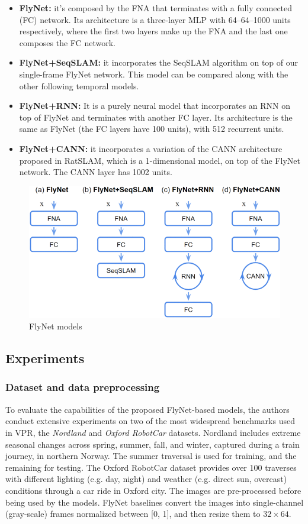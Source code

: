 \begin{itemize}
\item
  \textbf{FlyNet:} it's composed by the FNA that terminates with a fully
  connected (FC) network. Its architecture is a three-layer MLP with
  64--64--1000 units respectively, where the first two layers make up
  the FNA and the last one composes the FC network.
\item
  \textbf{FlyNet+SeqSLAM:} it incorporates the SeqSLAM algorithm on top
  of our single-frame FlyNet network. This model can be compared along
  with the other following temporal models.
\item
  \textbf{FlyNet+RNN:} It is a purely neural model that incorporates an
  RNN on top of FlyNet and terminates with another FC layer. Its
  architecture is the same as FlyNet (the FC layers have 100 units),
  with 512 recurrent units. 
\item
  \textbf{FlyNet+CANN:} it incorporates a variation of the CANN
  architecture proposed in RatSLAM, which is a 1-dimensional model, on
  top of the FlyNet network. The CANN layer has 1002 units.
\end{itemize}

\begin{figure}[h!]
\centering
\includegraphics[width=0.8\linewidth]{images/flynetmodels.png}
\caption{FlyNet models}
\end{figure}

\subsection{Experiments}\label{header-n205}

\subsubsection{Dataset and data preprocessing}\label{header-n206}

To evaluate the capabilities of the proposed FlyNet-based models, the
authors conduct extensive experiments on two of the most widespread
benchmarks used in VPR, the \emph{Nordland} and \emph{Oxford RobotCar}
datasets. Nordland includes extreme seasonal changes across spring,
summer, fall, and winter, captured during a train journey, in northern
Norway. The summer traversal is used for training, and the remaining for
testing. The Oxford RobotCar dataset provides over 100 traverses with
different lighting (e.g. day, night) and weather (e.g. direct sun,
overcast) conditions through a car ride in Oxford city. The images are
pre-processed before being used by the models. FlyNet baselines convert
the images into single-channel (gray-scale) frames normalized between
{[}0, 1{]}, and then resize them to $32 \times 64$.

